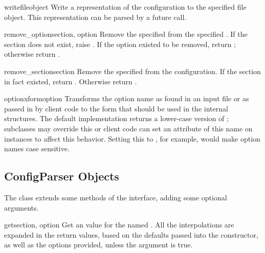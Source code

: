 \begin{methoddesc}{write}{fileobject}
Write a representation of the configuration to the specified file
object.  This representation can be parsed by a future 
call.
\end{methoddesc}

\begin{methoddesc}{remove_option}{section, option}
Remove the specified  from the specified .
If the section does not exist, raise . 
If the option existed to be removed, return ;
otherwise return .
\end{methoddesc}

\begin{methoddesc}{remove_section}{section}
Remove the specified  from the configuration.
If the section in fact existed, return .
Otherwise return .
\end{methoddesc}

\begin{methoddesc}{optionxform}{option}
Transforms the option name  as found in an input file or
as passed in by  client code to the form that should be used in the
internal structures.  The default implementation returns a lower-case
version of ; subclasses may override this or client code
can set an attribute of this name on instances to affect this
behavior.  Setting this to , for example, would make
option names case sensitive.
\end{methoddesc}


\subsection{ConfigParser Objects \label{ConfigParser-objects}}

The  class extends some methods of the
 interface, adding some optional arguments.

\begin{methoddesc}{get}{section, option}
Get an  value for the named .  All the
\character{\%} interpolations are expanded in the return values, based
on the defaults passed into the constructor, as well as the options
 provided, unless the  argument is true.
\end{methoddesc}

